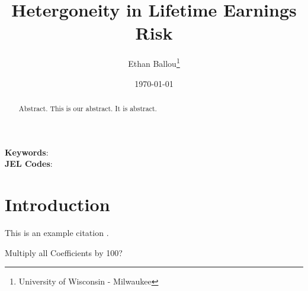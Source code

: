 \documentclass[12pt]{article}
\title{Hetergoneity in Lifetime Earnings Risk}
\author{Ethan Ballou\thanks{University of Wisconsin - Milwaukee}}
\date{\today}
\begin{document}
\maketitle
\thispagestyle{empty}



\begin{abstract}
\begin{singlespace}
\noindent 
Abstract.  This is our abstract.  It is abstract.  
\end{singlespace}
\end{abstract}
\noindent
\textbf{Keywords}: \\
\textbf{JEL Codes}: \\






\clearpage
\setcounter{page}{1}
\begin{center}
\end{center}




\section{Introduction}

This is an example citation \cite{exampleCitation}.

Multiply all Coefficients by 100?






\end{document}
